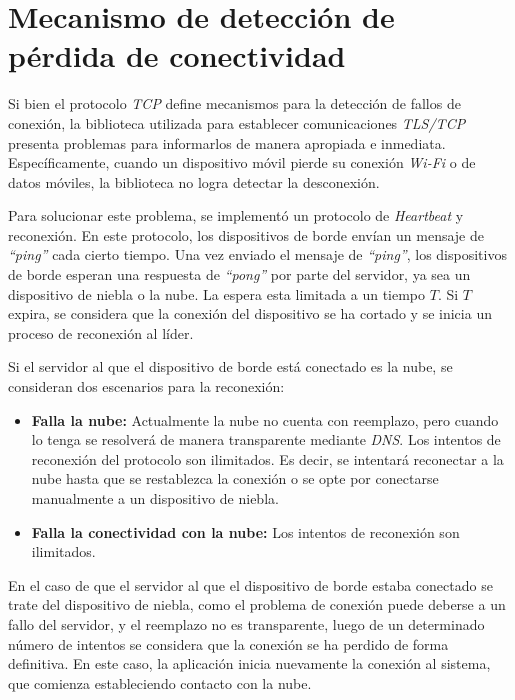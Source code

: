 \section{Mecanismo de detección de pérdida de conectividad}
\label{sec:perdidaConect}
Si bien el protocolo \textit{TCP} define mecanismos para la detección de fallos de conexión, la biblioteca utilizada para establecer comunicaciones \textit{TLS/TCP} presenta problemas para informarlos de manera apropiada e inmediata. Específicamente, cuando un dispositivo móvil pierde su conexión \textit{Wi-Fi} o de datos móviles, la biblioteca no logra detectar la desconexión. 

Para solucionar este problema, se implementó un protocolo de \textit{Heartbeat} y reconexión. En este protocolo, los dispositivos de borde envían un mensaje de \textit{``ping''} cada cierto tiempo. Una vez enviado el mensaje de \textit{``ping''}, los dispositivos de borde esperan una respuesta de \textit{``pong''} por parte del servidor, ya sea un dispositivo de niebla o la nube. La espera esta limitada a un tiempo $T$. Si $T$ expira, se considera que la conexión del dispositivo se ha cortado y se inicia un proceso de reconexión al líder. 

Si el servidor al que el dispositivo de borde está conectado es la nube, se consideran dos escenarios para la reconexión:

\begin{itemize}
    \item \textbf{Falla la nube: }Actualmente la nube no cuenta con reemplazo, pero cuando lo tenga se resolverá de manera transparente mediante \textit{DNS}. Los intentos de reconexión del protocolo son ilimitados. Es decir, se intentará reconectar a la nube hasta que se restablezca la conexión o se opte por conectarse manualmente a un dispositivo de niebla.
    \item \textbf{Falla la conectividad con la nube: }Los intentos de reconexión son ilimitados.
\end{itemize}

En el caso de que el servidor al que el dispositivo de borde estaba conectado se trate del dispositivo de niebla, como el problema de conexión puede deberse a un fallo del servidor, y el reemplazo no es transparente, luego de un determinado número de intentos se considera que la conexión se ha perdido de forma definitiva. En este caso, la aplicación inicia nuevamente la conexión al sistema, que comienza estableciendo contacto con la nube.

